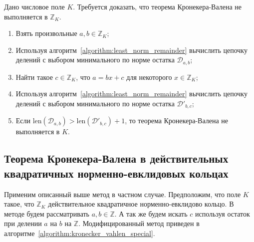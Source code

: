 \documentclass[_00_dissertation.tex]{subfiles}
\begin{document}
\begin{algorithm}\label{algorithm:kronecker_vahlen_common}
    Дано числовое поле $K$.
    Требуется доказать, что теорема Кронекера-Валена не выполняется в $\mathbb{Z}_K$.
    
    \begin{enumerate}
        \item Взять произвольные $a, b \in \mathbb{Z}_K$;

        \item Используя алгоритм~\ref{algorithm:least_norm_remainder} вычислить цепочку делений с выбором минимального по норме остатка $\mathcal{D}_{a, b}$;

        \item Найти такое $c \in \mathbb{Z}_K$, что $a = bx + c$ для некоторого $x \in \mathbb{Z}_K$;

        \item Используя алгоритм~\ref{algorithm:least_norm_remainder} вычислить цепочку делений с выбором минимального по норме остатка $\mathcal{D}'_{b,c}$;

        \item Если $\textrm{len}(\mathcal{D}_{a, b}) > \textrm{len}(\mathcal{D}'_{b, c}) + 1$, то теорема Кронекера-Валена не выполняется в $K$.
    \end{enumerate}
\end{algorithm}

\subsection{Теорема Кронекера-Валена в действительных квадратичных норменно-евклидовых кольцах}

Применим описанный выше метод в частном случае.
Предположим, что поле $K$ такое, что $\mathbb{Z}_K$ действительное квадратичное норменно-евклидово кольцо.
В методе будем рассматривать $a, b \in \mathbb{Z}$.
А так же будем искать $c$ используя остаток при делении $a$ на $b$ на $\mathbb{Z}$.
Модифицированный метод приведен в алгоритме~\ref{algorithm:kronecker_vahlen_special}.
\end{document}
